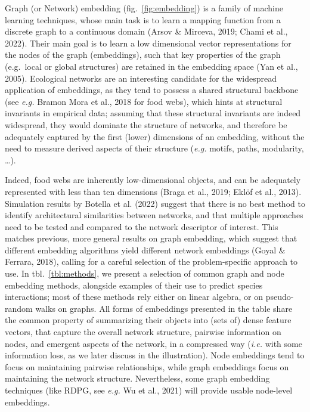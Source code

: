 \documentclass[11pt]{article}
\begin{document}
Graph (or Network) embedding (fig.~\ref{fig:embedding}) is a family of
machine learning techniques, whose main task is to learn a mapping
function from a discrete graph to a continuous domain (Arsov \& Mirceva,
2019; Chami et al., 2022). Their main goal is to learn a low dimensional
vector representations for the nodes of the graph (embeddings), such
that key properties of the graph (e.g.~local or global structures) are
retained in the embedding space (Yan et al., 2005). Ecological networks
are an interesting candidate for the widespread application of
embeddings, as they tend to possess a shared structural backbone (see
\emph{e.g.} Bramon Mora et al., 2018 for food webs), which hints at
structural invariants in empirical data; assuming that these structural
invariants are indeed widespread, they would dominate the structure of
networks, and therefore be adequately captured by the first (lower)
dimensions of an embedding, without the need to measure derived aspects
of their structure (\emph{e.g.} motifs, paths, modularity, \ldots).

Indeed, food webs are inherently low-dimensional objects, and can be
adequately represented with less than ten dimensions (Braga et al.,
2019; Eklöf et al., 2013). Simulation results by Botella et al. (2022)
suggest that there is no best method to identify architectural
similarities between networks, and that multiple approaches need to be
tested and compared to the network descriptor of interest. This matches
previous, more general results on graph embedding, which suggest that
different embedding algorithms yield different network embeddings (Goyal
\& Ferrara, 2018), calling for a careful selection of the
problem-specific approach to use. In tbl.~\ref{tbl:methods}, we present
a selection of common graph and node embedding methods, alongside
examples of their use to predict species interactions; most of these
methods rely either on linear algebra, or on pseudo-random walks on
graphs. All forms of embeddings presented in the table share the common
property of summarizing their objects into (sets of) dense feature
vectors, that capture the overall network structure, pairwise
information on nodes, and emergent aspects of the network, in a
compressed way (\emph{i.e.} with some information loss, as we later
discuss in the illustration). Node embeddings tend to focus on
maintaining pairwise relationships, while graph embeddings focus on
maintaining the network structure. Nevertheless, some graph embedding
techniques (like RDPG, see \emph{e.g.} Wu et al., 2021) will provide
usable node-level embeddings.
\end{document}
